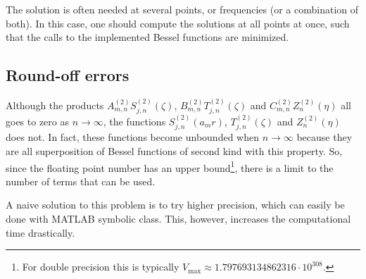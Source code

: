The solution is often needed at several points, or frequencies (or a combination of both). In this case, one should compute the solutions at all points at once, such that the calls to the implemented Bessel functions are minimized.

\subsection{Round-off errors}
\label{Subsec1:RoundoffErrors}
Although the products $A_{m,n}^{(2)}S_{j,n}^{(2)}(\zeta)$, $B_{m,n}^{(2)}T_{j,n}^{(2)}(\zeta)$ and $C_{m,n}^{(2)}Z_n^{(2)}(\eta)$ all goes to zero as $n\to\infty$, the functions $S_{j,n}^{(2)}(a_m r)$, $T_{j,n}^{(2)}(\zeta)$ and $Z_n^{(2)}(\eta)$ does not. In fact, these functions become unbounded when $n\to\infty$ because they are all superposition of Bessel functions of second kind with this property. So, since the floating point number has an upper bound\footnote{For double precision this is typically $V_{\mathrm{max}} \approx 1.797693134862316\cdot 10^{308}$.}, there is a limit to the number of terms that can be used. 

A naive solution to this problem is to try higher precision, which can easily be done with MATLAB symbolic class. This, however, increases the computational time drastically. 

